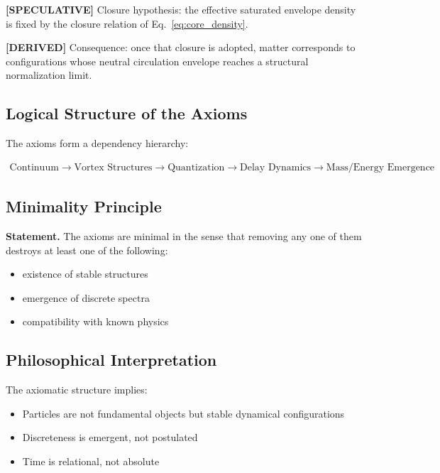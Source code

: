 \documentclass[11pt]{article}
\theoremstyle{definition}
\theoremstyle{plain}
\theoremstyle{remark}
\begin{document}
        \textbf{[SPECULATIVE]} Closure hypothesis: the effective saturated
        envelope density is fixed by the closure relation of Eq.~\eqref{eq:core_density}.

        \textbf{[DERIVED]} Consequence: once that closure is adopted, matter
        corresponds to configurations whose neutral circulation envelope reaches
        a structural normalization limit.
    
    \subsection{Logical Structure of the Axioms}
        
        The axioms form a dependency hierarchy:
        
        \begin{align}
            \text{Continuum}
            \rightarrow \text{Vortex Structures}
            \rightarrow \text{Quantization}
            \rightarrow \text{Delay Dynamics}
            \rightarrow \text{Mass/Energy Emergence}
        \end{align}
    
    \subsection{Minimality Principle}
        
        \textbf{Statement.}
        The axioms are minimal in the sense that removing any one of them destroys at least one of the following:
        
        \begin{itemize}
            \item existence of stable structures
            \item emergence of discrete spectra
            \item compatibility with known physics
        \end{itemize}
    
    \subsection{Philosophical Interpretation}
        
        The axiomatic structure implies:
        
        \begin{itemize}
            \item Particles are not fundamental objects but stable dynamical configurations
            \item Discreteness is emergent, not postulated
            \item Time is relational, not absolute
        \end{itemize}
    
\end{document}
